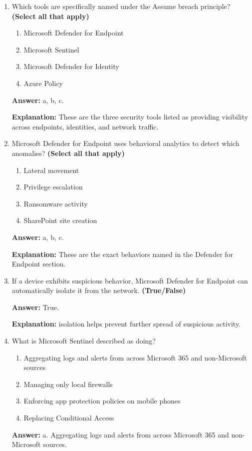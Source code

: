 \documentclass[10pt]{article}
\begin{document}
\begin{enumerate}[leftmargin=*]
\textbf{Explanation:} These three actions are explicitly named as the focus areas for minimizing breach impact.

\item Which tools are specifically named under the Assume breach principle? \textbf{(Select all that apply)}
\begin{enumerate}[label=\alph*., leftmargin=1.5em]
\item Microsoft Defender for Endpoint
\item Microsoft Sentinel
\item Microsoft Defender for Identity
\item Azure Policy
\end{enumerate}
\textbf{Answer:} a, b, c.

\textbf{Explanation:} These are the three security tools listed as providing visibility across endpoints, identities, and network traffic.

\item Microsoft Defender for Endpoint uses behavioral analytics to detect which anomalies? \textbf{(Select all that apply)}
\begin{enumerate}[label=\alph*., leftmargin=1.5em]
\item Lateral movement
\item Privilege escalation
\item Ransomware activity
\item SharePoint site creation
\end{enumerate}
\textbf{Answer:} a, b, c.

\textbf{Explanation:} These are the exact behaviors named in the Defender for Endpoint section.

\item If a device exhibits suspicious behavior, Microsoft Defender for Endpoint can automatically isolate it from the network. \textbf{(True/False)}

\textbf{Answer:} True.

\textbf{Explanation:} isolation helps prevent further spread of suspicious activity.

\item What is Microsoft Sentinel described as doing?
\begin{enumerate}[label=\alph*., leftmargin=1.5em]
\item Aggregating logs and alerts from across Microsoft 365 and non-Microsoft sources
\item Managing only local firewalls
\item Enforcing app protection policies on mobile phones
\item Replacing Conditional Access
\end{enumerate}
\textbf{Answer:} a. Aggregating logs and alerts from across Microsoft 365 and non-Microsoft sources.


\end{enumerate}
\end{document}
